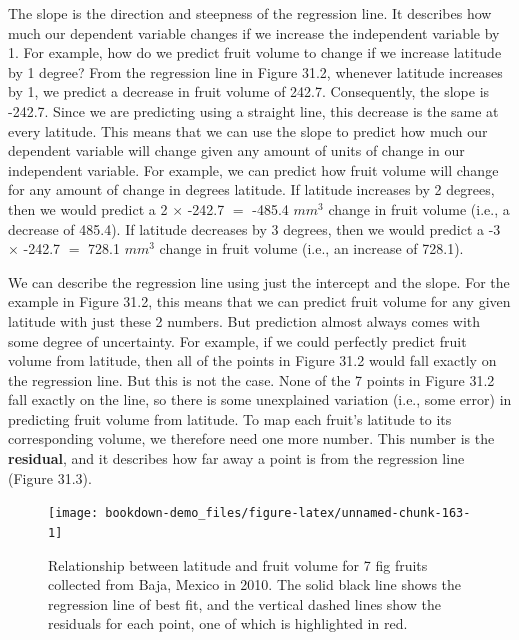 \documentclass[
]{scrbook}
\begin{document}
The slope is the direction and steepness of the regression line.
It describes how much our dependent variable changes if we increase the independent variable by 1.
For example, how do we predict fruit volume to change if we increase latitude by 1 degree?
From the regression line in Figure 31.2, whenever latitude increases by 1, we predict a decrease in fruit volume of 242.7.
Consequently, the slope is -242.7.
Since we are predicting using a straight line, this decrease is the same at every latitude.
This means that we can use the slope to predict how much our dependent variable will change given any amount of units of change in our independent variable.
For example, we can predict how fruit volume will change for any amount of change in degrees latitude.
If latitude increases by 2 degrees, then we would predict a 2 \(\times\) -242.7 \(=\) -485.4 \(mm^{3}\) change in fruit volume (i.e., a decrease of 485.4).
If latitude decreases by 3 degrees, then we would predict a -3 \(\times\) -242.7 \(=\) 728.1 \(mm^{3}\) change in fruit volume (i.e., an increase of 728.1).

We can describe the regression line using just the intercept and the slope.
For the example in Figure 31.2, this means that we can predict fruit volume for any given latitude with just these 2 numbers.
But prediction almost always comes with some degree of uncertainty.
For example, if we could perfectly predict fruit volume from latitude, then all of the points in Figure 31.2 would fall exactly on the regression line.
But this is not the case.
None of the 7 points in Figure 31.2 fall exactly on the line, so there is some unexplained variation (i.e., some error) in predicting fruit volume from latitude.
To map each fruit's latitude to its corresponding volume, we therefore need one more number.
This number is the \textbf{residual}, and it describes how far away a point is from the regression line (Figure 31.3).

\begin{figure}
\texttt{[image: bookdown-demo\_files/figure-latex/unnamed-chunk-163-1]} \caption{Relationship between latitude and fruit volume for 7 fig fruits collected from Baja, Mexico in 2010. The solid black line shows the regression line of best fit, and the vertical dashed lines show the residuals for each point, one of which is highlighted in red.}\label{fig:unnamed-chunk-163}
\end{figure}
\end{document}
